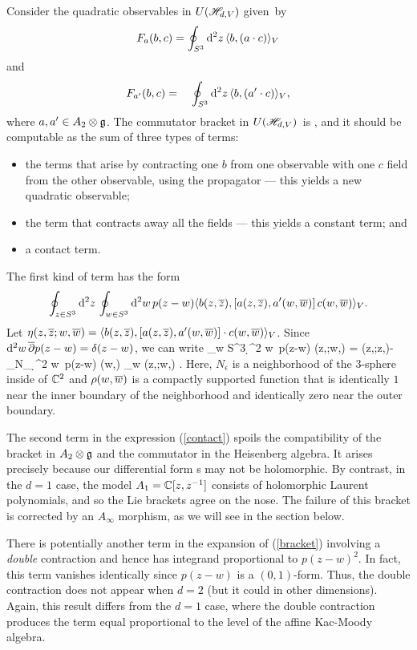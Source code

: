 Consider the quadratic observables in $U (\mathscr H_{d,V})$ given~by
\[
F_a(b,c) = \oint_{S^3} {\rm d}^2 z\, \langle b, (a \cdot c)\rangle_V 
\]
and
\[
F_{a'}(b,c) = \quad \oint_{S^3} {\rm d}^2 z\, \langle b, (a'\cdot c)\rangle_V,
\]
where $a,a' \in A_2 \otimes \mathfrak g$. 
The commutator bracket in $U (\mathscr H_{d,V})$~is
\beqn\label{bracket}
,
\eeqn
and it should be computable as the sum of three types of terms: 
\begin{itemize}
\item the terms that arise by contracting one $b$ from one observable with one $c$ field from the other observable, using the propagator --- this yields a new quadratic observable;
\item the term that contracts away all the fields --- this yields a constant term; and
\item a contact term.
\end{itemize}
The first kind of term has the form
\[
\oint_{z \in S^3} {\rm d}^2 z\, \oint_{w \in S^3} {\rm d}^2 w\, p(z-w) \langle b(z,\overline{z}), [a(z,\overline{z}), a'(w,\overline{w})] \, c(w,\overline{w})\rangle_V  .
\]
Let $\eta(z,\overline{z};w,\overline{w}) = \langle b(z,\overline{z}), [a(z,\overline{z}), a'(w,\overline{w})] \cdot c(w,\overline{w})\rangle_V$.
Since ${\rm d}^2 w\, \overline{\partial} p(z-w) = \delta(z-w)$, we can write 
\beqn\label{contact}
\oint_{w \in S^3} \d^2 w\, p(z-w) \eta(z,\zbar;w,\wbar) = \eta(z,\zbar;z,\zbar)- \int_{N_{\epsilon}} \d^2 w\, p(z-w) \rho(w,\wbar) \dbar_w \eta(z,\zbar;w,\wbar) .
\eeqn
Here, $N_\epsilon$ is a neighborhood of the $3$-sphere inside of $\mathbb C^2$ and $\rho(w,\overline{w})$ is a compactly supported function that is identically $1$ near the inner boundary of the neighborhood and identically zero near the outer boundary.

The second term in the expression (\ref{contact}) spoils the compatibility of the bracket in $A_2 \otimes \mathfrak g$ and the commutator in the Heisenberg algebra.
It arises precisely because our differential form s may not be holomorphic.
By contrast, in the $d=1$ case, the model $A_1 = \mathbb C[z,z^{-1}]$ consists of holomorphic Laurent polynomials, and so the Lie brackets agree on the nose. 
The failure of this bracket is corrected by an $A_\infty$ morphism, as we will see in the section below.

There is potentially another term in the expansion of (\ref{bracket}) involving a {\em double} contraction and hence has integrand proportional to $p(z-w)^2$. 
In fact, this term vanishes identically since $p(z-w)$ is a $(0,1)$-form. 
Thus, the double contraction does not appear when $d=2$ (but it could in other dimensions).
Again, this result differs from the $d=1$ case, where the double contraction produces the term equal proportional to the level of the affine Kac-Moody algebra. 

